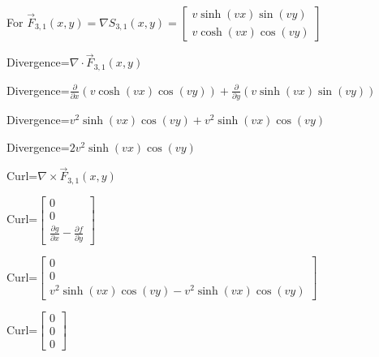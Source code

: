 \documentclass[12pt, executivepaper]{article}
\begin{document}
\begin{flushleft}
For $\vec F_{3,1}(x,y)=\nabla S_{3,1}(x,y)=
\begin{bmatrix}
v\sinh(vx)\sin(vy) \\
v\cosh(vx)\cos(vy)
\end{bmatrix}$

\vspace{3mm}

Divergence=$\nabla \cdot \vec F_{3,1}(x,y)$ \\

\vspace{3mm}

Divergence=$\frac{\partial}{\partial x}(v\cosh(vx)\cos(vy))+\frac{\partial}{\partial y}(v\sinh(vx)\sin(vy))$ \\

\vspace{3mm}

Divergence=$v^2\sinh(vx)\cos(vy)+v^2\sinh(vx)\cos(vy)$ \\

\vspace{3mm}

Divergence=$2v^2\sinh(vx)\cos(vy)$ \\

\vspace{3mm}

Curl=$\nabla \times \vec F_{3,1}(x,y)$ \\

\vspace{3mm}

Curl=$\begin{bmatrix}
0 \\
0 \\
\frac{\partial g}{\partial x}-\frac{\partial f}{\partial y}
\end{bmatrix}$ \\

\vspace{3mm}

Curl=$\begin{bmatrix}
0 \\
0 \\
v^2\sinh(vx)\cos(vy)-v^2\sinh(vx)\cos(vy)
\end{bmatrix}$ \\

\vspace{3mm}

Curl=$\begin{bmatrix}
0 \\
0 \\
0
\end{bmatrix}$ \\


\end{flushleft}
\end{document}
